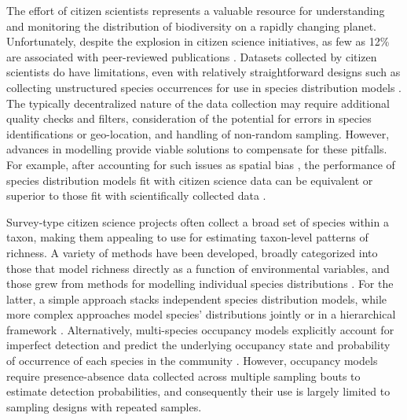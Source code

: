 \documentclass[preprint,final,times,12pt,3p]{elsarticle}
\begin{document}
The effort of citizen scientists represents a valuable resource for understanding and monitoring the distribution of biodiversity on a rapidly changing planet. Unfortunately, despite the explosion in citizen science initiatives, as few as 12\% are associated with peer-reviewed publications \citep{Theobald2015}. Datasets collected by citizen scientists do have limitations, even with relatively straightforward designs such as collecting unstructured species occurrences for use in species distribution models \citep{Theobald2015,Steen2019,Duan2020,Henckel2020}. The typically decentralized nature of the data collection may require additional quality checks and filters, consideration of the potential for errors in species identifications or geo-location, and handling of non-random sampling. However, advances in modelling provide viable solutions to compensate for these pitfalls. For example, after accounting for such issues as spatial bias \citep{Isaac2014,Steen2019,Johnston2020,Robinson2020}, the performance of species distribution models fit with citizen science data can be equivalent or superior to those fit with scientifically collected data \citep{Steen2019,Sumner2019,Henckel2020}. 

Survey-type citizen science projects often collect a broad set of species within a taxon, making them appealing to use for estimating taxon-level patterns of richness. A variety of methods have been developed, broadly categorized into those that model richness directly as a function of environmental variables, and those grew from methods for modelling individual species distributions \citep{Dubuis2011,Guisan2011,Calabrese2014,Biber2019}. For the latter, a simple approach stacks independent species distribution models, while more complex approaches model species' distributions jointly or in a hierarchical framework \citep{Caradima2019}. Alternatively, multi-species occupancy models explicitly account for imperfect detection and predict the underlying occupancy state and probability of occurrence of each species in the community \citep{Frishkoff2019,Guillera-Arroita2019,Szewczyk2018,Devarajan2020}. However, occupancy models require presence-absence data collected across multiple sampling bouts to estimate detection probabilities, and consequently their use is largely limited to sampling designs with repeated samples.
\end{document}
